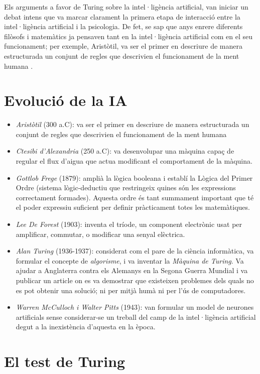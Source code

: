 Els arguments a favor de Turing sobre la intel·ligència artificial, van iniciar un debat intens que va marcar clarament la primera etapa de interacció entre la intel·ligència artificial i la psicologia. De fet, se sap que anys enrere diferents filòsofs i matemàtics ja pensaven tant en la intel·ligència artificial com en el seu funcionament; per exemple, Aristòtil, va ser el primer en descriure de manera estructurada un conjunt de regles que descrivien el funcionament de la ment humana \cite{IAgen} \cite{IAgenII}.

\section{Evolució de la IA}
\begin{itemize}
\item  \emph{Aristòtil} (300 a.C): va ser el primer en descriure de manera estructurada un conjunt de regles que descrivien el funcionament de la ment humana
\item  \emph{Ctesibi d'Alexandria} (250 a.C): va desenvolupar una màquina capaç de regular el flux d'aigua que actua modificant el comportament de la màquina.
\item \emph{Gottlob Frege} (1879): amplià la lògica booleana i establí la Lògica del Primer Ordre (sistema lògic-deductiu que restringeix quines són les expressions correctament formades). Aquesta ordre és tant summament important que té el poder expressiu suficient per definir pràcticament totes les matemàtiques.
\item \emph{Lee De Forest} (1903): inventa el tríode, un component electrònic usat per amplificar, commutar, o modificar una senyal elèctrica. \cite{Tri}
\item \emph{Alan Turing} (1936-1937): considerat com el pare de la ciència informàtica, va formular el concepte de \emph{algorisme}, i va inventar la \emph{Màquina de Turing}. Va ajudar a Anglaterra contra els Alemanys en la Segona Guerra Mundial i va publicar un article on es va demostrar que existeixen problemes dels quals no es pot obtenir una solució; ni per mitjà humà ni per l'ús de computadores.
\item \emph{Warren McCulloch i Walter Pitts} (1943): van formular un model de neurones artificials sense considerar-se un treball del camp de la intel·ligència artificial degut a la inexistència d'aquesta en la època.\cite{EvoIA}
\end{itemize}

\section{El test de Turing}

